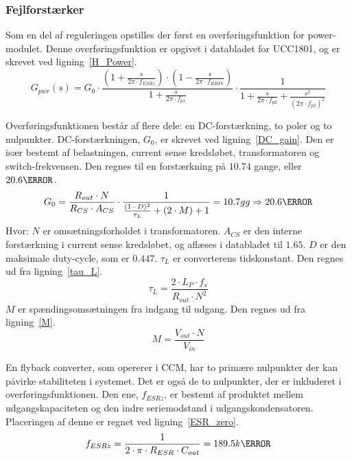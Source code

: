 \subsubsection{Fejlforstærker}
Som en del af reguleringen opstilles der først en overføringsfunktion for power-modulet. Denne overføringsfunktion er opgivet i databladet for UCC1801, og er skrevet ved ligning~\ref{H_Power}.
\begin{equation} \label{H_Power}
G_{pwr}(s) = G_0 \cdot \frac{(1+\frac{s}{2\pi \cdot f_{ESRz}}) \cdot (1-\frac{s}{2\pi \cdot f_{RHPz}})}{1+\frac{s}{2\pi \cdot f_{p1}}} \cdot \frac{1}{1 + \frac{s}{2\pi \cdot f_{p2}} + \frac{s^2}{(2\pi \cdot f_{p2})^2}}
\end{equation}

Overføringsfunktionen består af flere dele: en DC-forstærkning, to poler og to nulpunkter. DC-forstærkningen, $G_0$, er skrevet ved ligning~\ref{DC_gain}. Den er især bestemt af belastningen, current sense kredsløbet, transformatoren og switch-frekvensen. Den regnes til en forstærkning på $10.74$ gange, eller $20.6\decibel$.
\begin{equation} \label{DC_gain}
G_0 = \frac{R_{out} \cdot N}{R_{CS} \cdot A_{CS}} \cdot \frac{1}{\frac{(1-D)^2}{\tau_L} + (2 \cdot M) + 1} = 10.7gg \Rightarrow 20.6\decibel
\end{equation}
\noindent Hvor:
\newline \noindent $N$ er omsætningsforholdet i transformatoren.
\newline \noindent $A_{CS}$ er den interne forstærkning i current sense kredsløbet, og aflæses i databladet til $1.65$.
\newline \noindent $D$ er den maksimale duty-cycle, som er $0.447$.
\newline \noindent $\tau_L$ er converterens tidskonstant. Den regnes ud fra ligning~\ref{tau_L}.
\begin{equation} \label{tau_L}
\tau_L = \frac{2 \cdot L_P \cdot f_s}{R_{out} \cdot N^2}
\end{equation}
\newline \noindent $M$ er spændingsomsætningen fra indgang til udgang. Den regnes ud fra ligning~\ref{M}.
\begin{equation} \label{M}
M = \frac{V_{out} \cdot N}{V_{in}}
\end{equation}

En flyback converter, som opererer i CCM, har to primære nulpunkter der kan påvirke stabiliteten i systemet. Det er også de to nulpunkter, der er inkluderet i overføringsfunktionen. Den ene, $f_{ESRz}$, er bestemt af produktet mellem udgangskapaciteten og den indre seriemodstand i udgangskondensatoren. Placeringen af denne er regnet ved ligning~\ref{ESR_zero}.
\begin{equation} \label{ESR_zero}
f_{ESRz} = \frac{1}{2 \cdot \pi \cdot R_{ESR} \cdot C_{out}} = 189.5k\hertz
\end{equation}

